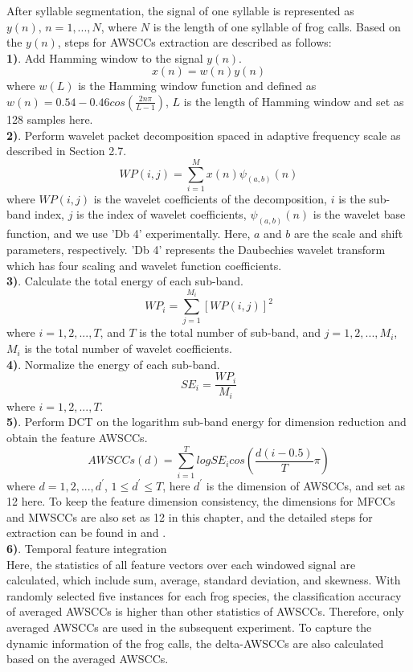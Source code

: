 After syllable segmentation, the signal of one syllable is represented as 
$y(n),\,n = 1,...,N$, where $N$ is the length of one syllable of frog calls. Based on the $y(n)$, steps for AWSCCs extraction are described as follows:\\
\textbf{1)}. Add Hamming window to the signal $y(n)$.
\begin{equation}
x(n) = w(n)y(n)
\end{equation}
\noindent where $w(L)$ is the Hamming window function and defined as $w(n)=0.54-0.46cos(\frac{2n\pi}{L-1}) $, $L$ is the length of Hamming window and set as 128 samples here.
\\
\textbf{2)}. Perform wavelet packet decomposition spaced in adaptive frequency scale as described in Section 2.7.
\begin{equation}
WP(i,j)=\sum_{i=1}^{M}x(n)\psi_{(a,b)}(n) 
\end{equation}
\noindent where $WP(i,j)$ is the wavelet coefficients of the decomposition, $i$ is the sub-band index, $j$ is the index of wavelet coefficients, $\psi_{(a,b)}(n)$ is the wavelet base function, and we use 'Db 4' experimentally. Here, $a$ and $b$ are the scale and shift parameters, respectively. 'Db 4' represents the Daubechies wavelet transform which has four scaling and wavelet function coefficients.
\\
\textbf{3)}. Calculate the total energy of each sub-band.
\begin{equation}
WP_{i}=\sum_{j=1}^{M_{i}}[WP(i,j)]^2
\end{equation}
\noindent where $i=1,2,...,T$, and $T$ is the total number of sub-band, and $j=1,2,...,M_{i}$, $M_{i}$ is the total number of wavelet coefficients.
\\
\textbf{4)}. Normalize the energy of each sub-band.
\begin{equation}
SE_{i}=\frac{WP_{i}}{M_{i}}
\end{equation}
\noindent where $i=1,2,...,T$.
\\
\textbf{5)}. Perform DCT on the logarithm sub-band energy for dimension reduction and obtain the feature AWSCCs.
\begin{equation}
AWSCCs(d)=\sum_{i=1}^{T}logSE_{i}cos(\frac{d(i-0.5)}{T}\pi)
\end{equation}
\noindent where $d=1,2,...,d^{'}$, $1 \leq d^{'} \leq T$, here $d^{'}$ is the dimension of AWSCCs, and set as 12 here. To keep the feature dimension consistency, the dimensions for MFCCs and MWSCCs are also set as 12 in this chapter, and the detailed steps for extraction can be found in \citep{bedoya2014automatic} and \citep{Zhang2015108}.
\\
\textbf{6)}. Temporal feature integration
\\
Here, the statistics of all feature vectors over each windowed signal are calculated, which include sum, average, standard deviation, and skewness. With randomly selected five instances for each frog species, the classification accuracy of averaged AWSCCs is higher than other statistics of AWSCCs. Therefore, only averaged AWSCCs are used in the subsequent experiment. To capture the dynamic information of the frog calls, the delta-AWSCCs are also calculated based on the averaged AWSCCs. 




